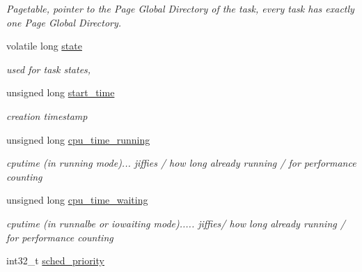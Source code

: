 \begin{CompactItemize}
\begin{CompactList}\small\item\em Pagetable, pointer to the Page Global Directory of the task, every task has exactly one Page Global Directory. \item\end{CompactList}\item 
volatile long \hyperlink{structprocess_control_block_b4db55d4f01fe77a8afe8debb9c701fd}{state}
\begin{CompactList}\small\item\em used for task states, \item\end{CompactList}\item 
\hypertarget{structprocess_control_block_6f4757b4e3c771f3b7251fc947f87864}{
unsigned long \hyperlink{structprocess_control_block_6f4757b4e3c771f3b7251fc947f87864}{start\_\-time}}
\label{structprocess_control_block_6f4757b4e3c771f3b7251fc947f87864}

\begin{CompactList}\small\item\em creation timestamp \item\end{CompactList}\item 
\hypertarget{structprocess_control_block_459444de3deb07d946e9e51b2d42a743}{
unsigned long \hyperlink{structprocess_control_block_459444de3deb07d946e9e51b2d42a743}{cpu\_\-time\_\-running}}
\label{structprocess_control_block_459444de3deb07d946e9e51b2d42a743}

\begin{CompactList}\small\item\em cputime (in running mode)... jiffies / how long already running / for performance counting \item\end{CompactList}\item 
\hypertarget{structprocess_control_block_e47d6266c3d12363d51288c00bb8dcd3}{
unsigned long \hyperlink{structprocess_control_block_e47d6266c3d12363d51288c00bb8dcd3}{cpu\_\-time\_\-waiting}}
\label{structprocess_control_block_e47d6266c3d12363d51288c00bb8dcd3}

\begin{CompactList}\small\item\em cputime (in runnalbe or iowaiting mode)..... jiffies/ how long already running / for performance counting \item\end{CompactList}\item 
\hypertarget{structprocess_control_block_e1ec74771382f57fa0b561b1f3350cf0}{
int32\_\-t \hyperlink{structprocess_control_block_e1ec74771382f57fa0b561b1f3350cf0}{sched\_\-priority}}
\label{structprocess_control_block_e1ec74771382f57fa0b561b1f3350cf0}


\end{CompactItemize}
